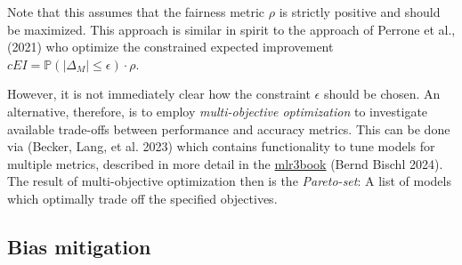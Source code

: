Note that this assumes that the fairness metric \(\rho\) is strictly positive and should be maximized.
This approach is similar in spirit to the approach of Perrone et al., (2021) who optimize the constrained expected improvement \(cEI = \mathbb{P}(|\Delta_M| \leq \epsilon) \cdot \rho\).

However, it is not immediately clear how the constraint \(\epsilon\) should be chosen.
An alternative, therefore, is to employ \emph{multi-objective optimization} to investigate available trade-offs between performance and accuracy metrics.
This can be done via  (Becker, Lang, et al. 2023) which contains functionality to tune models for multiple metrics, described in more detail in the \href{https://mlr3book.mlr-org.com/optimization.html\#mult-measures-tuning}{mlr3book} (Bernd Bischl 2024).
The result of multi-objective optimization then is the \emph{Pareto-set}: A list of models which optimally trade off the specified objectives.

\hypertarget{bias-mitigation}{%
\subsection{Bias mitigation}\label{bias-mitigation}}

